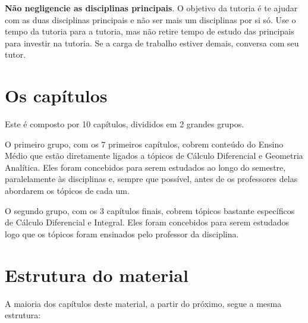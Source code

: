 \textbf{Não negligencie as disciplinas principais}. O objetivo da tutoria é te ajudar com as duas disciplinas principais e não ser mais um disciplinas por si só. Use o tempo da tutoria para a tutoria, mas não retire tempo de estudo das principais para investir na tutoria. Se a carga de trabalho estiver demais, conversa com seu tutor.

\section{Os capítulos}

Este é composto por 10 capítulos, divididos em 2 grandes grupos.

O primeiro grupo, com os 7 primeiros capítulos, cobrem conteúdo do Ensino Médio que estão diretamente ligados a tópicos de Cálculo Diferencial e Geometria Analítica. Eles foram concebidos para serem estudados ao longo do semestre, paralelamente às disciplinas e, sempre que possível, antes de os professores delas abordarem os tópicos de cada um.

O segundo grupo, com os 3 capítulos finais, cobrem tópicos bastante específicos de Cálculo Diferencial e Integral. Eles foram concebidos para serem estudados logo que os tópicos foram ensinados pelo professor da disciplina.

\section{Estrutura do material}

A maioria dos capítulos deste material, a partir do próximo, segue a mesma estrutura:

